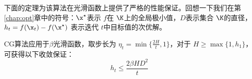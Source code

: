 下面的定理为该算法在光滑函数上提供了严格的性能保证。回想一下我们在第\ref{chap:opt}章中的符号：$\x^\star$表示 $f$在 $\K$上的全局极小值，$D$表示集合 $\K$的直径，$h_t = f(\x_t) - f(\x^\star)$ 表示迭代 $t$中目标值的次优解。
\begin{theorem} \label{thm:offlineFW}
CG算法应用于$\beta$光滑函数，取步长为 $\eta_t =  \min\{\frac{2H}{t},1\}$，对于 $H \geq \max\{1,h_1\} $，可获得以下收敛保证：
$$ h_t \leq \frac{2 \beta H D^2 }{t} $$
\end{theorem}
